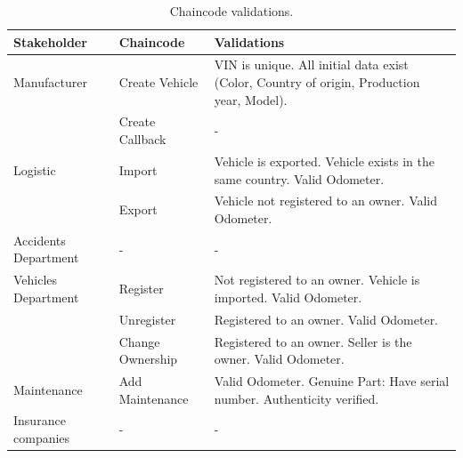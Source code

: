 \begin{table}[H]
	\caption{Chaincode validations.}
	\label{tab:chaincode-validations}
	\tiny
	\begin{tabularx}{\linewidth}{X|X|X}
		\toprule
		Stakeholder        & Chaincode        & Validations
		\\
		\toprule
		Manufacturer         & Create Vehicle   &  VIN is unique. \newline
		All initial data exist (Color, Country of origin, Production year, Model). \\
		\cmidrule{2-3}
		& Create Callback  & -                                                                                                       \\
		\midrule
		Logistic             & Import           & Vehicle is exported. \newline Vehicle exists in the same country. \newline Valid 
		Odometer.
		\\
		\cmidrule{2-3}
		& Export           & Vehicle not registered to an owner. \newline Valid Odometer.                                            \\
		\midrule
		Accidents Department & -                & -
		\\
		\midrule
		Vehicles Department  & Register         & Not registered to an owner. \newline Vehicle is imported. \newline Valid Odometer.
		\\
		\cmidrule{2-3}
		& Unregister       & Registered to an owner. \newline Valid Odometer.                                                        \\
		\cmidrule{2-3}
		& Change Ownership & Registered to an owner. \newline Seller is the owner. \newline Valid Odometer.                          \\
		\midrule
		Maintenance          & Add Maintenance  & Valid Odometer. \newline Genuine Part: \newline Have serial number. \newline
		Authenticity verified.     \\
		\midrule
		Insurance companies  & -                & -
		\\
		\bottomrule
	\end{tabularx}
\end{table}
